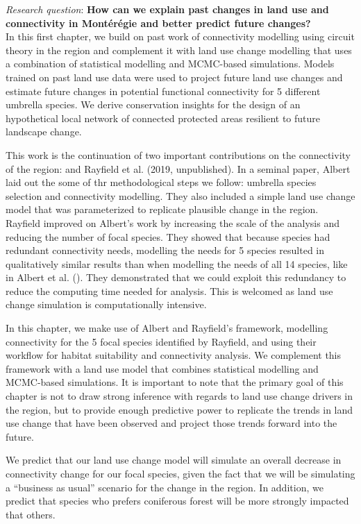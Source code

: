 \textit{Research question}: \textbf{How can we explain past changes in land use and connectivity in Montérégie and better predict future changes?}\\

In this first chapter, we build on past work of connectivity modelling using circuit theory in the region and complement it with land use change modelling that uses a combination of statistical modelling and MCMC-based simulations. Models trained on past land use data were used to project future land use changes and estimate future changes in potential functional connectivity for 5 different umbrella species. We derive conservation insights for the design of an hypothetical local network of connected protected areas resilient to future landscape change.

This work is the continuation of two important contributions on the connectivity of the region: \cite{albert_applying_2017} and Rayfield et al. (2019, unpublished). In a seminal paper, Albert laid out the some of thr methodological steps we follow: umbrella species selection and connectivity modelling. They also included a simple land use change model that was parameterized to replicate plausible change in the region. Rayfield improved on Albert’s work by increasing the scale of the analysis and reducing the number of focal species. They showed that because species had redundant connectivity needs, modelling the needs for 5 species resulted in qualitatively similar results than when modelling the needs of all 14 species, like in Albert et al. (\citeyear{albert_applying_2017}). They demonstrated that we could exploit this redundancy to reduce the computing time needed for analysis. This is welcomed as land use change simulation is computationally intensive.

In this chapter, we make use of Albert and Rayfield’s framework, modelling connectivity for the 5 focal species identified by Rayfield, and using their workflow for habitat suitability and connectivity analysis. We complement this framework with a land use model that combines statistical modelling and MCMC-based simulations. It is important to note that the primary goal of this chapter is not to draw strong inference with regards to land use change drivers in the region, but to provide enough predictive power to replicate the trends in land use change that have been observed and project those trends forward into the future.

We predict that our land use change model will simulate an overall decrease in connectivity change for our focal species, given the fact that we will be simulating a “business as usual” scenario for the change in the region. In addition, we predict that species who prefers coniferous forest will be more strongly impacted that others.\\

